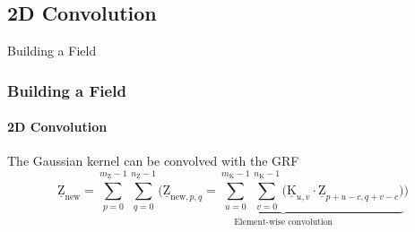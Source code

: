 \documentclass[professionalfont,10pt]{beamer}
\begin{document}
	\subsection{2D Convolution}
	\begin{frame}[t]{Building a Field}
	\frametitle{Building a Field}
	\framesubtitle{2D Convolution}
	\hskip-0.75cm
	\begin{minipage}[t]{0.2\linewidth}\vspace{-0.5cm}
		\tiny\tableofcontents[currentsection,currentsubsection,hideothersubsections,subsectionstyle=show/shaded]
	\end{minipage}
	\hfill%
	\begin{minipage}[t]{0.86\linewidth}\vspace{-0.5cm}
		\begin{flushleft}
			The Gaussian kernel can be convolved with the GRF
			\begin{equation}
				\underline{\text{Z}}_{\text{new}} = \sum_{p=0}^{m_{\underline{\text{Z}}}-1}\sum_{q=0}^{n_{\underline{\text{Z}}}-1}\bigg(
				\underbrace{\underline{\text{Z}}_{\text{new},p,q} = \sum_{u=0}^{m_{\underline{\text{K}}}-1}\sum_{v=0}^{n_{\underline{\text{K}}}-1}\big(\underline{\text{K}}_{u,v} \cdot {\underline{\text{Z}}}_{p+u-c, q+v-c}\big)}_\text{Element-wise convolution}
				\bigg)
			\end{equation}
		\end{flushleft}
	\end{minipage}
	\vfill%
	\end{frame}
\end{document}
